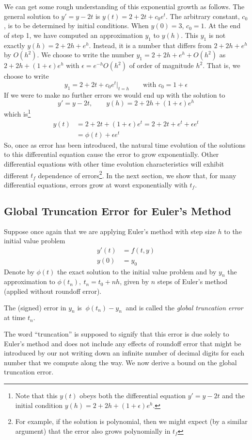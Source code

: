 We can get some rough understanding of this exponential growth as follows.
The general solution to $y'=y-2t$ is $y(t)=2+2t+c_0e^t$. The arbitrary constant,
$c_0$, is to be determined by initial conditions. When $y(0)=3$, $c_0=1$.
At the end of step 1, we have computed an approximation $y_1$ to $y(h)$.
This $y_1$ is not exactly $y(h)=2+2h+e^h$. Instead, it is a number that differs
from $2+2h+e^h$ by $O(h^2)$. We choose to write the number $y_1=2+2h+e^h+O(h^2)$ as $2+2h+(1+\epsilon)e^h$ with $\epsilon=e^{-h} O(h^2)$ 
of order of magnitude $h^2$. That is, we choose to write 
\begin{equation*}
y_1=2+2t+c_0e^t\Big|_{t=h}\qquad\text{with }c_0=1+\epsilon
\end{equation*}
If we were to make no further errors we would 
end up with the solution to
\begin{equation*}
y'=y-2t,\qquad y(h)= 2+2h+(1+\epsilon)e^h
\end{equation*}
which is\footnote{Note that this $y(t)$ obeys both the differential equation
$y'=y-2t$ and the initial condition $y(h)= 2+2h+(1+\epsilon)e^h$.}
\begin{align*}
y(t) &= 2+2t+(1+\epsilon)e^t
=2+2t+ e^t +\epsilon e^t \\
&=\phi(t) +\epsilon e^t
\end{align*}
So, once as error has been introduced, the natural time evolution of the
solutions to this differential equation cause the error to grow exponentially.
Other differential equations with other time evolution characteristics
will exhibit different $t_f$ dependence of errors\footnote{For example, if the solution is polynomial, then we might expect (by a similar argument) that the error also grows polynomially in $t_f$}. In the next
section, we show that, for many differential equations, errors grow at
worst exponentially with $t_f$. 

\subsection{Global Truncation Error for Euler's Method}
Suppose once again that we are applying Euler's method with step size $h$ to
 the initial value problem 
\begin{align*}
y'(t)&=f(t,y) \\
y(0)&=y_0
\end{align*}
Denote by $\phi(t)$ the exact solution to the initial value problem and
by $y_n$ the approximation to $\phi(t_n),\ t_n=t_0+nh$, given by $n$ steps
of Euler's method (applied without roundoff error). 
\begin{defn}\label{def:globalTrunc}
The (signed) error in $y_n$ is 
$\ 
\phi(t_n)-y_n
\ $ 
and is called the \emph{global truncation error} at time $t_n$. 
\end{defn}\noindent
The word ``truncation'' is supposed to signify that this error is due solely to
Euler's method and does not include any effects of roundoff error that might be introduced by our not writing down an infinite number of decimal digits for each number that we compute along the way.
We now derive a bound on the global truncation error. 

